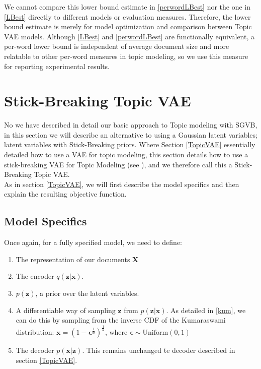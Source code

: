 \documentclass{report}
\begin{document}
We cannot compare this lower bound estimate in \ref{perwordLBest} nor the one in \ref{LBest} directly to different models or evaluation measures. Therefore, the lower bound estimate is merely for model optimization and comparison between Topic VAE models. Although \ref{LBest} and \ref{perwordLBest} are functionally equivalent, a per-word lower bound is independent of average document size and more relatable to other per-word measures in topic modeling, so we use this measure for reporting experimental results.



\section{Stick-Breaking Topic VAE}
No we have described in detail our basic approach to Topic modeling with SGVB, in this section we will describe an alternative to using a Gaussian latent variables; latent variables with Stick-Breaking priors. Where Section \ref{TopicVAE} essentially detailed how to use a VAE for topic modeling, this section details how to use a stick-breaking VAE for Topic Modeling (see \cite{nalisnick2016deep}), and we therefore call this a Stick-Breaking Topic VAE.\\

As in section \ref{TopicVAE}, we will first describe the model specifics and then explain the resulting objective function.
\subsection{Model Specifics}
Once again, for a fully specified model, we need to define:
\begin{enumerate}
	\item The representation of our documents $\mathbf{X}$
	\item The encoder $q(\mathbf{z}|\mathbf{x})$.
	\item $p(\mathbf{z})$, a prior  over the latent variables. 
	\item A differentiable way of sampling $\mathbf{z}$ from $p(\mathbf{z}|\mathbf{x})$. As detailed in \ref{kum}, we can do this by sampling from the inverse CDF of the Kumaraswami distribution: $\mathbf{x} = (1-\boldsymbol{\epsilon}^{\frac{1}{\mathbf{b}}})^{\frac{1}{\mathbf{a}}}$, where $\boldsymbol{\epsilon} \sim \text{Uniform}(0,1)$
	\item The decoder $p(\mathbf{x}|\mathbf{z})$. This remains unchanged te decoder described in section \ref{TopicVAE}.
\end{enumerate}
\end{document}
